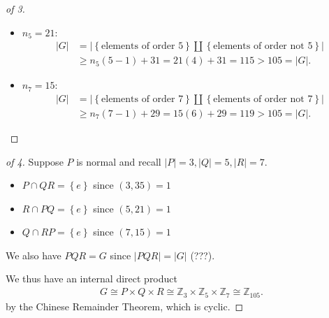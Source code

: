\begin{solution}
\begin{proof}[of 3]
\begin{itemize}
  \begin{itemize}
  \item
    \(n_5 = 21\):
    \begin{align*}
    {\left\lvert {G} \right\rvert}  &= {\left\lvert {\left\{{\text{elements of order } 5}\right\} {\textstyle\coprod}\left\{{\text{elements of order not } 5}\right\}} \right\rvert} \\
    &\geq n_5(5-1) + 31 = 21(4) + 31 = 115 > 105 = {\left\lvert {G} \right\rvert}
    .\end{align*}
  \item
    \(n_7 = 15\):
    \begin{align*}
    {\left\lvert {G} \right\rvert}  &= {\left\lvert {\left\{{\text{elements of order } 7}\right\} {\textstyle\coprod}\left\{{\text{elements of order not } 7}\right\}} \right\rvert} \\
    &\geq n_7(7-1) + 29 = 15(6) + 29 = 119 > 105 = {\left\lvert {G} \right\rvert}
    .\end{align*}
  \end{itemize}
\end{itemize}

\end{proof}

\begin{proof}[of 4]

Suppose \(P\) is normal and recall
\({\left\lvert {P} \right\rvert} = 3, {\left\lvert {Q} \right\rvert} = 5, {\left\lvert {R} \right\rvert} = 7\).

\begin{itemize}
\tightlist
\item
  \(P\cap QR = \left\{{e}\right\}\) since \((3, 35) = 1\)
\item
  \(R\cap PQ = \left\{{e}\right\}\) since \((5, 21) = 1\)
\item
  \(Q\cap RP = \left\{{e}\right\}\) since \((7, 15) = 1\)
\end{itemize}

We also have \(PQR = G\) since
\({\left\lvert {PQR} \right\rvert} = {\left\lvert {G} \right\rvert}\)
(???).

We thus have an internal direct product
\begin{align*}
G \cong P\times Q \times R \cong {\mathbb{Z}}_3 \times{\mathbb{Z}}_5 \times{\mathbb{Z}}_7 \cong {\mathbb{Z}}_{105}
.\end{align*}
by the Chinese Remainder Theorem, which is cyclic.

\end{proof}

\end{solution}

